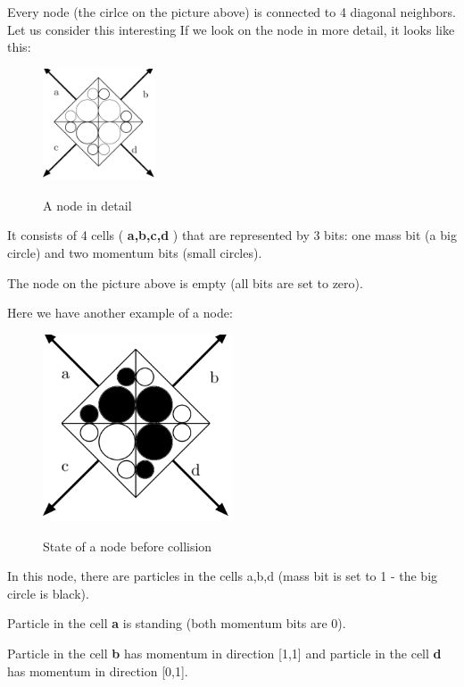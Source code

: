 Every node (the cirlce on the picture above) is connected to 4 diagonal neighbors.
Let us consider this interesting 
If we look on the node in more detail, it looks like this:

\begin{figure}[htbp]
 \centering 
 \includegraphics[width=0.3\textwidth]{./img/node_empty}
 \label{empty}
 \caption{A node in detail}
\end{figure}

\newpage
It consists of 4 cells ( \textbf{a,b,c,d} ) that are represented by 3 bits:
one mass bit (a big circle) and two momentum bits (small circles).

The node on the picture above is empty (all bits are set to zero).

Here we have another example of a node:
\begin{figure}[htbp]
 \centering 
 \includegraphics[width=0.5\textwidth]{./img/node_1}
 \label{pre_collision}
 \caption{State of a node before collision}
\end{figure}

In this node, there are particles in the cells a,b,d (mass bit is set to 1 - the big circle is black).

Particle in the cell \textbf{a} is standing (both momentum bits are 0).

Particle in the cell \textbf{b} has momentum in direction [1,1] and particle in the cell \textbf{d} has momentum in direction [0,1].

